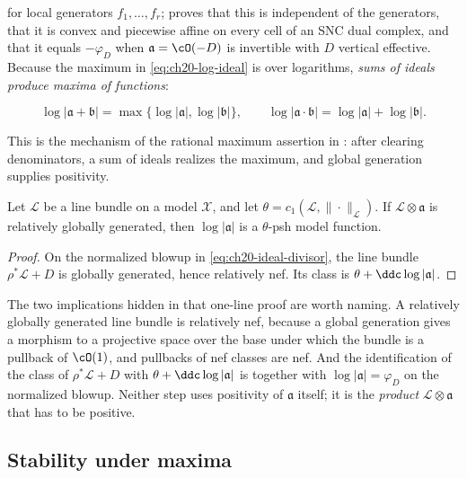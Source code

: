 for local generators $f_1,\dots,f_r$; 
proves that this is independent of the generators, that it is convex and
piecewise affine on every cell of an SNC dual complex, and that it equals
$-\varphi_D$ when $\mathfrak a=\cO(-D)$ is invertible with $D$
vertical effective.  Because the maximum in \eqref{eq:ch20-log-ideal} is
over logarithms, \emph{sums of ideals produce maxima of functions}:

\begin{equation}
\label{eq:ch20-ideal-sum-max}
 \log|\mathfrak a+\mathfrak b|
 =\max\{\log|\mathfrak a|,\log|\mathfrak b|\},
 \qquad
 \log|\mathfrak a\cdot\mathfrak b|
 =\log|\mathfrak a|+\log|\mathfrak b| .
\end{equation}

This is the mechanism of the rational maximum assertion in
: after clearing denominators, a sum of ideals
realizes the maximum, and global generation supplies positivity.

\begin{lemma}\label{lem:ch20-generated-ideal-psh}
Let $\mathcal L$ be a line bundle on a model $\mathcal X$, and let
$\theta=c_1(\mathcal L,\|\cdot\|_{\mathcal L})$.  If
$\mathcal L\otimes\mathfrak a$ is relatively globally generated, then
$\log|\mathfrak a|$ is a $\theta$-psh model function.
\end{lemma}

\begin{proof}
On the normalized blowup in \eqref{eq:ch20-ideal-divisor}, the line bundle
$\rho^*\mathcal L+D$ is globally generated, hence relatively nef.  Its
class is $\theta+\ddc\log|\mathfrak a|$.
\end{proof}

The two implications hidden in that one-line proof are worth naming.  A
relatively globally generated line bundle is relatively nef, because a
global generation gives a morphism to a projective space over the base under
which the bundle is a pullback of $\cO(1)$, and pullbacks of nef classes
are nef.  And the identification of the class of $\rho^*\mathcal L+D$ with
$\theta+\ddc\log|\mathfrak a|$ is
 together with
$\log|\mathfrak a|=\varphi_D$ on the normalized blowup.  Neither step uses
positivity of $\mathfrak a$ itself; it is the \emph{product}
$\mathcal L\otimes\mathfrak a$ that has to be positive.

\subsection{Stability under maxima}
\label{sec:ch20-max}

